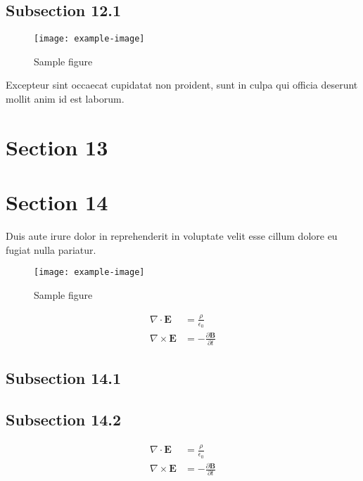 \documentclass{article}
\begin{document}

\subsection{Subsection 12.1}

\begin{figure}[h]
    \centering
    \texttt{[image: example-image]}
    \caption{Sample figure}
    \label{fig:sample}
\end{figure}

Excepteur sint occaecat cupidatat non proident, sunt in culpa qui officia deserunt mollit anim id est laborum.

\section{Section 13}

\section{Section 14}

Duis aute irure dolor in reprehenderit in voluptate velit esse cillum dolore eu fugiat nulla pariatur.

\begin{figure}[h]
    \centering
    \texttt{[image: example-image]}
    \caption{Sample figure}
    \label{fig:sample}
\end{figure}

\begin{align}
    \nabla \cdot \mathbf{E} &= \frac{\rho}{\epsilon_0} \\
    \nabla \times \mathbf{E} &= -\frac{\partial \mathbf{B}}{\partial t}
\end{align}

\subsection{Subsection 14.1}

\subsection{Subsection 14.2}

\begin{align}
    \nabla \cdot \mathbf{E} &= \frac{\rho}{\epsilon_0} \\
    \nabla \times \mathbf{E} &= -\frac{\partial \mathbf{B}}{\partial t}
\end{align}
\end{document}
